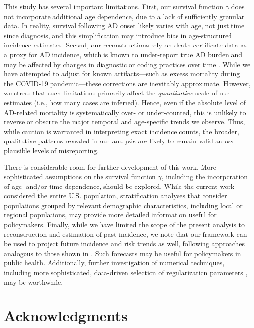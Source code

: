 \documentclass{article}
\begin{document}
\par This study has several important limitations. First, our survival function $\gamma$ does not incorporate additional age dependence, due to a lack of sufficiently granular data. In reality, survival following AD onset likely varies with age, not just time since diagnosis, and this simplification may introduce bias in age-structured incidence estimates. Second, our reconstructions rely on death certificate data as a proxy for AD incidence, which is known to under-report true AD burden and may be affected by changes in diagnostic or coding practices over time \cite{brown2024trends, romero2014under,stokes2020estimates}. While we have attempted to adjust for known artifacts—such as excess mortality during the COVID-19 pandemic—these corrections are inevitably approximate. However, we stress that such limitations primarily affect the \textit{quantitative} scale of our estimates (i.e., how many cases are inferred). Hence, even if the absolute level of AD-related mortality is systematically over- or under-counted, this is unlikely to reverse or obscure the major temporal and age-specific trends we observe. Thus, while caution is warranted in interpreting exact incidence counts, the broader, qualitative patterns revealed in our analysis are likely to remain valid across plausible levels of misreporting.


\par There is considerable room for further development of this work. More sophisticated assumptions on the survival function $\gamma$, including the incorporation of age- and/or time-dependence, should be explored. While the current work considered the entire U.S. population, stratification analyses that consider populations grouped by relevant demographic characteristics, including local or regional populations, may provide more detailed information useful for policymakers. Finally, while we have limited the scope of the present analysis to reconstruction and estimation of past incidence, we note that our framework can be used to project future incidence and risk trends as well, following approaches analogous to those shown in \cite{viguerie2025aging}. Such forecasts may be useful for policymakers in public health. Additionally, further investigation of numerical techniques, including more sophisticated, data-driven selection of regularization parameters \cite{Sgattoni2025}, may be worthwhile.

\section*{Acknowledgments}
\end{document}
